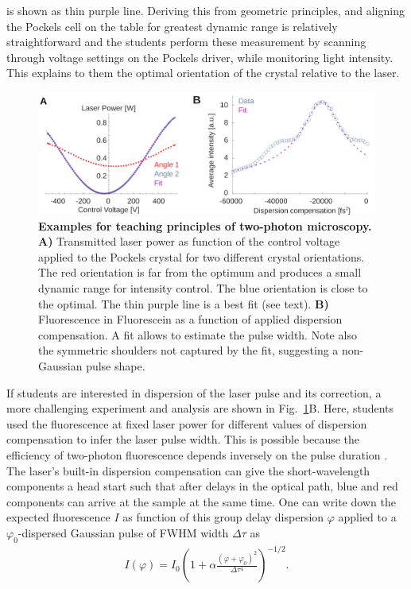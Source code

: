 \documentclass[10pt,letterpaper]{article}
\begin{document}
is shown as thin purple line. Deriving this from geometric principles, and aligning the Pockels cell on the table for greatest dynamic range is relatively straightforward and the students perform these measurement by scanning through voltage settings on the Pockels driver, while monitoring light intensity. This explains to them the optimal orientation of the crystal relative to the laser.\newline
%
\begin{figure}[!t]
    \includegraphics[width=\textwidth]{fig9.jpg}
    \caption{{\bf Examples for teaching principles of two-photon microscopy.} \textbf{A)} Transmitted laser power as function of the control voltage applied to the Pockels crystal for two different crystal orientations. The red orientation is far from the optimum and produces a small dynamic range for intensity control. The blue orientation is close to the optimal. The thin purple line is a best fit (see text). \textbf{B)} Fluorescence in Fluorescein as a function of applied dispersion compensation. A fit allows to estimate the pulse width. Note also the symmetric shoulders not captured by the fit, suggesting a non-Gaussian pulse shape.}
    \label{fig9}
\end{figure}
%
If students are interested in dispersion of the laser pulse and its correction, a more challenging experiment and analysis are shown in Fig.~\ref{fig9}B. Here, students used the fluorescence at fixed laser power for different values of dispersion compensation to infer the laser pulse width. This is possible because the efficiency of two-photon fluorescence depends inversely on the pulse duration \cite{Denk1990}. The laser's built-in dispersion compensation can give the short-wavelength components a head start such that after delays in the optical path, blue and red components can arrive at the sample at the same time. One can write down the expected fluorescence $I$ as function of this group delay dispersion $\varphi$ applied to a $\varphi_0$-dispersed Gaussian pulse of FWHM width $\Delta\tau$ as
\begin{eqnarray}
    I(\varphi) =I_0 \left(1+\alpha\frac{(\varphi+\varphi_0)^2}{\Delta\tau^4}\right)^{-1/2}.
\end{eqnarray}
\end{document}
